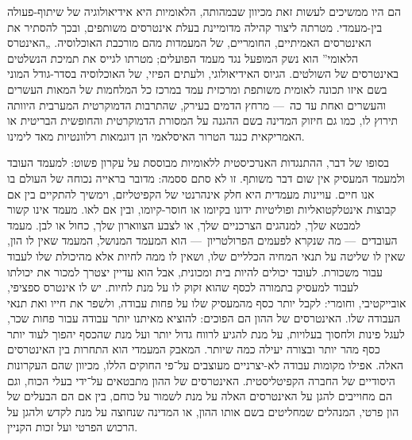 הם היו ממשיכים לעשות זאת מכיוון שבמהותה, הלאומיות היא אידיאולוגיה של שיתוף-פעולה בין-מעמדי. מטרתה ליצור קהילה מדומיינת בעלת אינטרסים משותפים, ובכך להסתיר את האינטרסים האמיתיים, החומריים, של המעמדות מהם מורכבת האוכלוסיה. „האינטרס הלאומי” הוא נשק המופעל נגד מעמד הפועלים; מטרתו לגייס את תמיכת הנשלטים באינטרסים של השולטים. הגיוס האידיאולוגי, ולעתים הפיזי, של האוכלוסיה בסדר-גודל המוני בשם איזו תכונה לאומית משותפת ומרכזית עמד במרכז כל המלחמות של המאות העשרים והעשרים ואחת עד כה~— מרחץ הדמים בעירק,  שהתרבות הדמוקרטית המערבית היוותה תירוץ לו, כמו גם חיזוק המדינה בשם ההגנה על המסורת הדמוקרטית והחופשית הבריטית או האמריקאית כנגד הטרור האיסלאמי הן דוגמאות רלוונטיות מאד לימינו.

בסופו של דבר, ההתנגדות האנרכיסטית ללאומיות מבוססת על עקרון פשוט: למעמד העובד ולמעמד המעסיק אין שום דבר משותף. זו לא סתם ססמה: מדובר בראייה נכוחה של העולם בו אנו חיים. עויינות מעמדית היא חלק אינהרנטי של הקפיטליזם, וימשיך להתקיים בין אם קבוצות אינטלקטואליות ופוליטיות ידונו בקיומו או חוסר-קיומו, ובין אם לאו. מעמד אינו קשור למבטא שלך, למנהגים הצרכניים שלך, או לצבע הצווארון שלך, כחול או לבן. מעמד העובדים~— מה שנקרא לפעמים הפרולטריון~— הוא המעמד המנושל, המעמד שאין לו הון, שאין לו שליטה על תנאי המחיה הכלליים שלו, ושאין לו ממה לחיות אלא מהיכולת שלו לעבוד עבור משכורת. לעובד יכולים להיות בית ומכונית, אבל הוא עדיין יצטרך למכור את יכולתו לעבוד למעסיק בתמורה לכסף שהוא זקוק לו על מנת לחיות. יש לו אינטרס ספציפי, אובייקטיבי, וחומרי: לקבל יותר כסף מהמעסיק שלו על פחות עבודה, ולשפר את חייו ואת תנאי העבודה שלו. האינטרסים של ההון הם הפוכים: להוציא מאיתנו יותר עבודה עבור פחות שכר, לעגל פינות ולחסוך בעלויות, על מנת להגיע לרווח גדול יותר ועל מנת שהכסף יהפוך לעוד יותר כסף מהר יותר ובצורה יעילה כמה שיותר. המאבק המעמדי הוא התחרות בין האינטרסים האלה. אפילו מקומות עבודה לא-יצרניים מעוצבים על־פי החוקים הללו, מכיוון שהם העקרונות היסודיים של החברה הקפיטליסטית. האינטרסים של ההון מתבטאים על־ידי בעלי הכוח, וגם הם מחוייבים להגן על האינטרסים האלה על מנת לשמור על כוחם, בין אם הם הבעלים של הון פרטי, המנהלים שמחליטים בשם אותו ההון, או המדינה שנחוצה על מנת לקדש ולהגן על הרכוש הפרטי ועל זכות הקניין.

